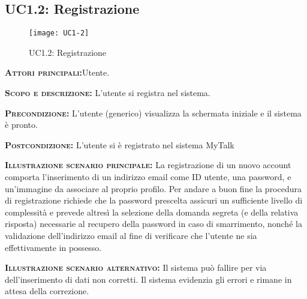 \subsection{UC1.2: Registrazione}
\begin{figure}[h]
\centering
\texttt{[image: UC1-2]}
\caption{UC1.2: Registrazione}\label{UC1.2}
\end{figure}
\begin{description}
\item{\scshape\bfseries Attori principali:}Utente.
\item{\scshape\bfseries Scopo e descrizione:} L'utente si registra nel sistema.
\item{\scshape\bfseries Precondizione:} L'utente (generico) visualizza la schermata iniziale e il sistema è pronto.
\item{\scshape\bfseries Postcondizione:} L'utente si è registrato nel sistema MyTalk
\item{\scshape\bfseries Illustrazione scenario principale:} La registrazione di un nuovo account comporta l'inserimento di un indirizzo email come ID utente, una password, e un'immagine da associare al proprio profilo. Per andare a buon fine la procedura di registrazione richiede che la password prescelta assicuri un sufficiente livello di complessità e prevede altresì la selezione della domanda segreta (e della relativa risposta) necessarie al recupero della password in caso di smarrimento, nonché la validazione dell'indirizzo email al fine di verificare che l'utente ne sia effettivamente in possesso.
\item{\scshape\bfseries Illustrazione scenario alternativo:} Il sistema può fallire per via dell'inserimento di dati non corretti. Il sistema evidenzia gli errori e rimane in attesa della correzione.
\end{description}

